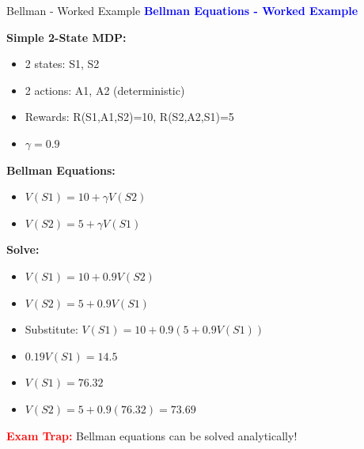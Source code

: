 \documentclass[8pt]{beamer}
\begin{document}
	\begin{frame}{Bellman - Worked Example}
		\fontsize{6.5}{7.5}\selectfont
		\textcolor{blue}{\textbf{Bellman Equations - Worked Example}}
		
		\textbf{Simple 2-State MDP:}
		\begin{itemize}
			\item 2 states: S1, S2
			\item 2 actions: A1, A2 (deterministic)
			\item Rewards: R(S1,A1,S2)=10, R(S2,A2,S1)=5
			\item $\gamma = 0.9$
		\end{itemize}
		
		\textbf{Bellman Equations:}
		\begin{itemize}
			\item $V(S1) = 10 + \gamma V(S2)$
			\item $V(S2) = 5 + \gamma V(S1)$
		\end{itemize}
		
		\textbf{Solve:}
		\begin{itemize}
			\item $V(S1) = 10 + 0.9V(S2)$
			\item $V(S2) = 5 + 0.9V(S1)$
			\item Substitute: $V(S1) = 10 + 0.9(5 + 0.9V(S1))$
			\item $0.19V(S1) = 14.5$
			\item $V(S1) = 76.32$
			\item $V(S2) = 5 + 0.9(76.32) = 73.69$
		\end{itemize}
		
		\textcolor{red}{\textbf{Exam Trap:}} Bellman equations can be solved analytically!
	\end{frame}
	
	
\end{document}
